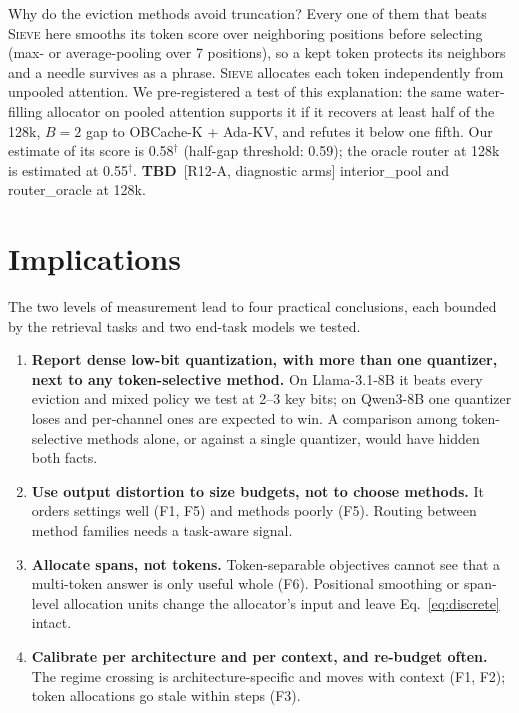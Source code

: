\documentclass{article}
\newcommand{\tbd}[1]{{\color{tbdcol}\textbf{TBD}~#1}}
\newcommand{\est}[1]{{\color{estcol}#1$^{\dagger}$}}
\newcommand{\sieve}{\textsc{Sieve}}
\theoremstyle{definition}
\begin{document}
Why do the eviction methods avoid truncation?  Every one of them that beats \sieve{} here smooths its token score over neighboring positions before selecting (max- or average-pooling over 7 positions), so a kept token protects its neighbors and a needle survives as a phrase.  \sieve{} allocates each token independently from unpooled attention.  We pre-registered a test of this explanation: the same water-filling allocator on pooled attention supports it if it recovers at least half of the 128k, $B=2$ gap to OBCache-K + Ada-KV, and refutes it below one fifth.  Our estimate of its score is \est{0.58} (half-gap threshold: 0.59); the oracle router at 128k is estimated at \est{0.55}.  \tbd{[R12-A, diagnostic arms] interior\_pool and router\_oracle at 128k.}

\section{Implications}
\label{sec:implications}

The two levels of measurement lead to four practical conclusions, each bounded by the retrieval tasks and two end-task models we tested.
\begin{enumerate}[leftmargin=*,itemsep=1pt,topsep=2pt]
  \item \textbf{Report dense low-bit quantization, with more than one quantizer, next to any token-selective method.}  On Llama-3.1-8B it beats every eviction and mixed policy we test at 2--3 key bits; on Qwen3-8B one quantizer loses and per-channel ones are expected to win.  A comparison among token-selective methods alone, or against a single quantizer, would have hidden both facts.
  \item \textbf{Use output distortion to size budgets, not to choose methods.}  It orders settings well (F1, F5) and methods poorly (F5).  Routing between method families needs a task-aware signal.
  \item \textbf{Allocate spans, not tokens.}  Token-separable objectives cannot see that a multi-token answer is only useful whole (F6).  Positional smoothing or span-level allocation units change the allocator's input and leave Eq.~\ref{eq:discrete} intact.
  \item \textbf{Calibrate per architecture and per context, and re-budget often.}  The regime crossing is architecture-specific and moves with context (F1, F2); token allocations go stale within steps (F3).
\end{enumerate}
\end{document}
